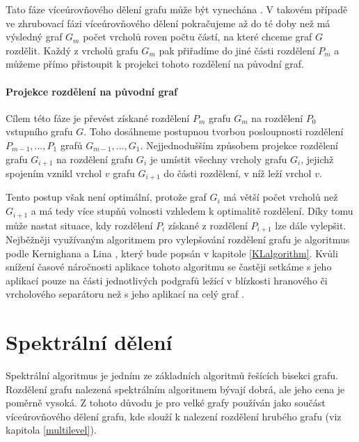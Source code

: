 \documentclass{ctuthesis}
\theoremstyle{plain}
\theoremstyle{definition}
\begin{document}
Tato fáze víceúrovňového dělení grafu může být vynechána \cite{kaku:95}. V takovém případě ve zhrubovací fázi víceúrovňového dělení pokračujeme až do té doby než má výsledný graf $G_m$ počet vrcholů roven počtu částí, na které chceme graf $G$ rozdělit. Každý z vrcholů grafu $G_m$ pak přiřadíme do jiné části rozdělení $P_m$ a můžeme přímo přistoupit k projekci tohoto rozdělení na původní graf.

\paragraph{Projekce rozdělení na původní graf}
Cílem této fáze je převést získané rozdělení $P_m$ grafu $G_m$ na rozdělení $P_0$ vstupního grafu $G$. Toho dosáhneme postupnou tvorbou posloupnosti rozdělení $P_{m-1}, \ldots, P_1$ grafů $G_{m-1}, \ldots, G_1$. Nejjednodušším způsobem projekce rozdělení grafu $G_{i+1}$ na rozdělení grafu $G_i$ je umístit všechny vrcholy grafu $G_i$, jejichž spojením vznikl vrchol $v$ grafu $G_{i+1}$ do části rozdělení, v níž leží vrchol $v$.

Tento postup však není optimální, protože graf $G_i$ má větší počet vrcholů než $G_{i+1}$ a má tedy více stupňů volnosti vzhledem k optimalitě rozdělení. Díky tomu může nastat situace, kdy rozdělení $P_i$ získané z rozdělení $P_{i+1}$ lze dále vylepšit. Nejběžněji využívaným algoritmem pro vylepšování rozdělení grafu je algoritmus podle Kernighana a Lina \cite{keli:70}, který bude popsán v kapitole \ref{KLalgorithm}. Kvůli snížení časové náročnosti aplikace tohoto algoritmu se častěji setkáme s jeho aplikací pouze na části jednotlivých podgrafů ležící v blízkosti hranového či vrcholového separátoru než s jeho aplikací na celý graf \cite{kaku:98}.

\section{Spektrální dělení}
\label{spektral}

Spektrální algoritmus je jedním ze základních algoritmů řešících bisekci grafu. Rozdělení grafu nalezená spektrálním algoritmem bývají dobrá, ale jeho cena je poměrně vysoká. Z tohoto důvodu je pro velké grafy používán jako součást víceúrovňového dělení grafu, kde slouží k nalezení rozdělení hrubého grafu (viz kapitola \ref{multilevel}).
\end{document}
